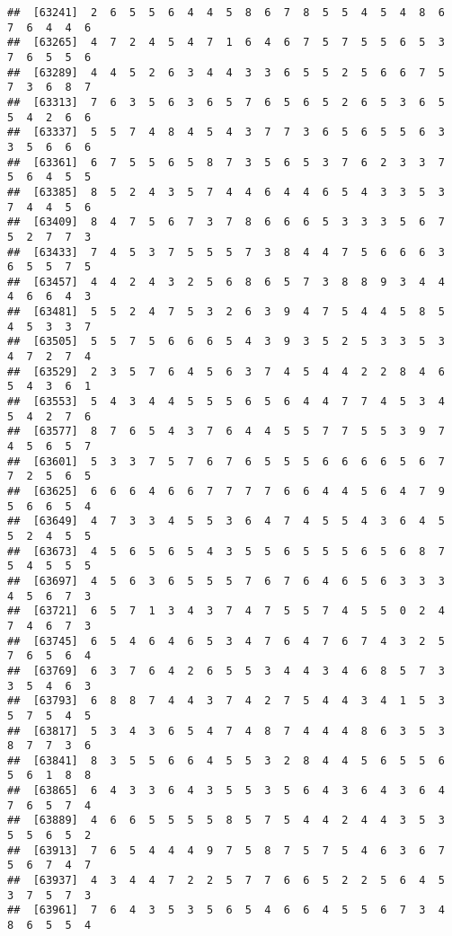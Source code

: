 \documentclass[
]{book}
\begin{document}
\begin{verbatim}
##  [63241]  2  6  5  5  6  4  4  5  8  6  7  8  5  5  4  5  4  8  6  7  6  4  4  6
##  [63265]  4  7  2  4  5  4  7  1  6  4  6  7  5  7  5  5  6  5  3  7  6  5  5  6
##  [63289]  4  4  5  2  6  3  4  4  3  3  6  5  5  2  5  6  6  7  5  7  3  6  8  7
##  [63313]  7  6  3  5  6  3  6  5  7  6  5  6  5  2  6  5  3  6  5  5  4  2  6  6
##  [63337]  5  5  7  4  8  4  5  4  3  7  7  3  6  5  6  5  5  6  3  3  5  6  6  6
##  [63361]  6  7  5  5  6  5  8  7  3  5  6  5  3  7  6  2  3  3  7  5  6  4  5  5
##  [63385]  8  5  2  4  3  5  7  4  4  6  4  4  6  5  4  3  3  5  3  7  4  4  5  6
##  [63409]  8  4  7  5  6  7  3  7  8  6  6  6  5  3  3  3  5  6  7  5  2  7  7  3
##  [63433]  7  4  5  3  7  5  5  5  7  3  8  4  4  7  5  6  6  6  3  6  5  5  7  5
##  [63457]  4  4  2  4  3  2  5  6  8  6  5  7  3  8  8  9  3  4  4  4  6  6  4  3
##  [63481]  5  5  2  4  7  5  3  2  6  3  9  4  7  5  4  4  5  8  5  4  5  3  3  7
##  [63505]  5  5  7  5  6  6  6  5  4  3  9  3  5  2  5  3  3  5  3  4  7  2  7  4
##  [63529]  2  3  5  7  6  4  5  6  3  7  4  5  4  4  2  2  8  4  6  5  4  3  6  1
##  [63553]  5  4  3  4  4  5  5  5  6  5  6  4  4  7  7  4  5  3  4  5  4  2  7  6
##  [63577]  8  7  6  5  4  3  7  6  4  4  5  5  7  7  5  5  3  9  7  4  5  6  5  7
##  [63601]  5  3  3  7  5  7  6  7  6  5  5  5  6  6  6  6  5  6  7  7  2  5  6  5
##  [63625]  6  6  6  4  6  6  7  7  7  7  6  6  4  4  5  6  4  7  9  5  6  6  5  4
##  [63649]  4  7  3  3  4  5  5  3  6  4  7  4  5  5  4  3  6  4  5  5  2  4  5  5
##  [63673]  4  5  6  5  6  5  4  3  5  5  6  5  5  5  6  5  6  8  7  5  4  5  5  5
##  [63697]  4  5  6  3  6  5  5  5  7  6  7  6  4  6  5  6  3  3  3  4  5  6  7  3
##  [63721]  6  5  7  1  3  4  3  7  4  7  5  5  7  4  5  5  0  2  4  7  4  6  7  3
##  [63745]  6  5  4  6  4  6  5  3  4  7  6  4  7  6  7  4  3  2  5  7  6  5  6  4
##  [63769]  6  3  7  6  4  2  6  5  5  3  4  4  3  4  6  8  5  7  3  3  5  4  6  3
##  [63793]  6  8  8  7  4  4  3  7  4  2  7  5  4  4  3  4  1  5  3  5  7  5  4  5
##  [63817]  5  3  4  3  6  5  4  7  4  8  7  4  4  4  8  6  3  5  3  8  7  7  3  6
##  [63841]  8  3  5  5  6  6  4  5  5  3  2  8  4  4  5  6  5  5  6  5  6  1  8  8
##  [63865]  6  4  3  3  6  4  3  5  5  3  5  6  4  3  6  4  3  6  4  7  6  5  7  4
##  [63889]  4  6  6  5  5  5  5  8  5  7  5  4  4  2  4  4  3  5  3  5  5  6  5  2
##  [63913]  7  6  5  4  4  4  9  7  5  8  7  5  7  5  4  6  3  6  7  5  6  7  4  7
##  [63937]  4  3  4  4  7  2  2  5  7  7  6  6  5  2  2  5  6  4  5  3  7  5  7  3
##  [63961]  7  6  4  3  5  3  5  6  5  4  6  6  4  5  5  6  7  3  4  8  6  5  5  4

\end{verbatim}
\end{document}
